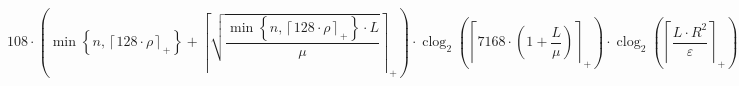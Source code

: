 \[108 \cdot \left(\min\left\{ n, \left\lceil 128 \cdot \rho \right\rceil_{+} \right\} + \left\lceil \sqrt{\frac{\min\left\{ n, \left\lceil 128 \cdot \rho \right\rceil_{+} \right\} \cdot L}{\mu}} \right\rceil_{+}\right) \cdot \operatorname{clog}_{2}\left(\left\lceil 7168 \cdot \left(1 + \frac{L}{\mu}\right) \right\rceil_{+}\right) \cdot \operatorname{clog}_{2}\left(\left\lceil \frac{L \cdot R^{2}}{\varepsilon} \right\rceil_{+}\right)\]
